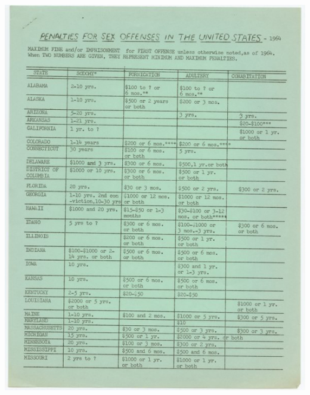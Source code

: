 \begin{refsection}
\begin{marginfigure}
 \begin{center}

     \includegraphics{../images/MattachineSocietyPamphlet1964-A.jpg}

\end{center}
\end{marginfigure}
\end{refsection}
